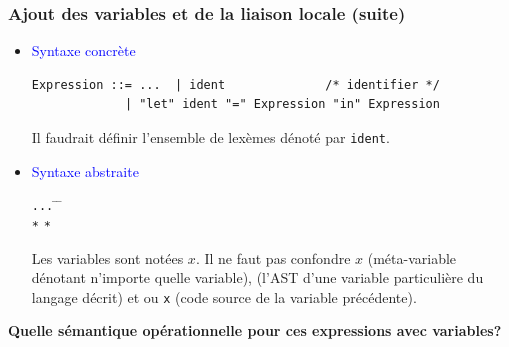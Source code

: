 %
\begin{frame}[containsverbatim]
\frametitle{Ajout des variables et de la liaison locale (suite)}

\label{let_in_et_var}

\begin{itemize}

  \item \textcolor{blue}{Syntaxe concrète}
    {\small
     \begin{verbatim}
Expression ::= ...  | ident              /* identifier */
             | "let" ident "=" Expression "in" Expression
     \end{verbatim}
     }

  \vspace*{-5pt}

  Il faudrait définir l'ensemble de lexèmes dénoté par \texttt{ident}.

  \medskip

  \item \textcolor{blue}{Syntaxe abstraite}
    {\small
     \begin{tabbing}
     \Xtype {} \equal \texttt{...} \= \vbar{} \= 
     \Xof {} \quad {}\\
     \> \vbar \>  \Xof {} \texttt{*} 
     \texttt{*} \semi{}
     \end{tabbing}
    }

  \medskip

  Les variables sont notées $x$. Il ne faut pas confondre $x$
  (méta-variable dénotant n'importe quelle variable), 
   (l'AST d'une variable particulière du langage décrit) et
   ou \texttt{x} (code source de la variable précédente).

\end{itemize}

\medskip

\textbf{Quelle sémantique opérationnelle pour ces expressions avec
  variables?}

\end{frame}

